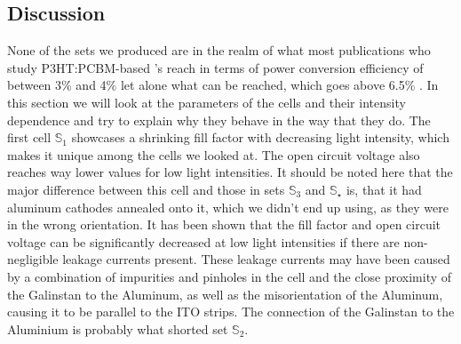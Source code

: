 \documentclass[a4paper,10pt,twocolumn]{article}
\begin{document}
\begin{extract*}

\section{Discussion}\label{sec:discussion}
%
%
None of the sets we produced are in the realm of what most publications who study P3HT:PCBM-based \BHSC's reach in terms of power conversion efficiency of between 3\% and 4\% let alone what can be reached, which goes above 6.5\% \cite{source13}. In this section we will look at the parameters of the cells and their intensity dependence and try to explain why they behave in the way that they do.\mypar
The first cell $\mathbb{S}_1$ showcases a shrinking fill factor with decreasing light intensity, which makes it unique among the cells we looked at. The open circuit voltage also reaches way lower values for low light intensities. It should be noted here that the major difference between this cell and those in sets $\mathbb{S}_3$ and $\mathbb{S}_\star$ is, that it had aluminum cathodes annealed onto it, which we didn't end up using, as they were in the wrong orientation. It has been shown \cite{source12} that the fill factor and open circuit voltage can be significantly decreased at low light intensities if there are non-negligible leakage currents present. These leakage currents may have been caused by a combination of impurities and pinholes in the cell and the close proximity of the Galinstan to the Aluminum, as well as the misorientation of the Aluminum, causing it to be parallel to the ITO strips. The connection of the Galinstan to the Aluminium is probably what shorted set $\mathbb{S}_2$.\mypar

\end{extract*}
\end{document}
